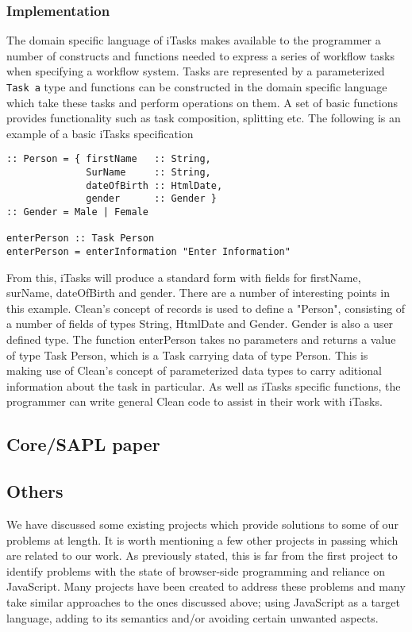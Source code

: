 \subsubsection{Implementation}
The domain specific language of iTasks makes available to the programmer a
number of constructs and functions needed to express a series of workflow
tasks when specifying a workflow system. Tasks are represented by a 
parameterized \verb!Task a!
type and functions can be constructed in the domain specific language which
take these tasks and perform operations on them. A set of basic functions
provides functionality such as task composition, splitting etc. The following
is an example of a basic iTasks specification

\begin{verbatim}
:: Person = { firstName   :: String, 
              SurName     :: String,
              dateOfBirth :: HtmlDate,
              gender      :: Gender }
:: Gender = Male | Female

enterPerson :: Task Person
enterPerson = enterInformation "Enter Information"
\end{verbatim}

From this, iTasks will produce a standard form with fields for firstName, 
surName, dateOfBirth and gender. There are a number of interesting points
in this example. Clean's concept of records is used to define a "Person",
consisting of a number of fields of types String, HtmlDate and Gender. 
Gender is also a user defined type. The function enterPerson takes no
parameters and returns a value of type Task Person, which is a Task
carrying data of type Person. This is making use of Clean's concept 
of parameterized data types to carry aditional information about the 
task in particular. As well as iTasks specific functions, the programmer
can write general Clean code to assist in their work with iTasks.

\subsection{Core/SAPL paper}


\subsection{Others}
We have discussed some existing projects which provide solutions to 
some of our problems at length. It is worth mentioning a few other 
projects in passing which are related to our work. As previously stated,
this is far from the first project to identify problems with the state
of browser-side programming and reliance on JavaScript. Many projects
have been created to address these problems and many take similar 
approaches to the ones discussed above; using JavaScript as a target
language, adding to its semantics and/or avoiding certain unwanted 
aspects.

